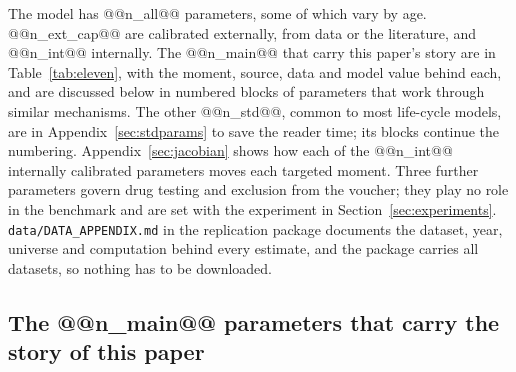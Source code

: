 \documentclass[10pt]{article}
\begin{document}
The model has @@n_all@@ parameters, some of which vary by age. @@n_ext_cap@@ are calibrated externally, from data or the literature, and @@n_int@@ internally. The @@n_main@@ that carry this paper's story are in Table~\ref{tab:eleven}, with the moment, source, data and model value behind each, and are discussed below in numbered blocks of parameters that work through similar mechanisms. The other @@n_std@@, common to most life-cycle models, are in Appendix~\ref{sec:stdparams} to save the reader time; its blocks continue the numbering. Appendix~\ref{sec:jacobian} shows how each of the @@n_int@@ internally calibrated parameters moves each targeted moment. Three further parameters govern drug testing and exclusion from the voucher; they play no role in the benchmark and are set with the experiment in Section~\ref{sec:experiments}. \texttt{data/DATA\_APPENDIX.md} in the replication package documents the dataset, year, universe and computation behind every estimate, and the package carries all datasets, so nothing has to be downloaded.

\subsection{The @@n_main@@ parameters that carry the story of this paper}\label{sec:fmainpar}


\end{document}
